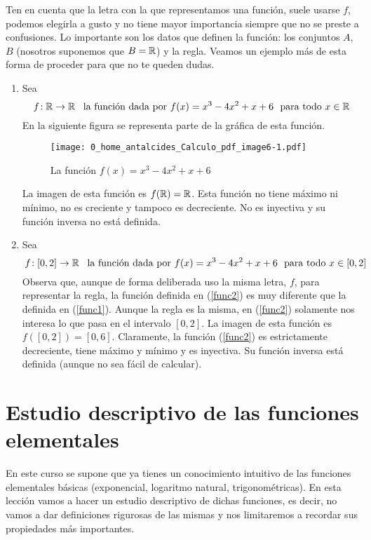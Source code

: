 \documentclass[oneside,spanish,2m,twoside,svgnames,x11names,HTML,12pt]{libro-matua}\usepackage[]{graphicx}\usepackage[]{color}
\begin{document}
Ten en cuenta que la letra con la que representamos una función, suele
usarse $f$, podemos elegirla a gusto y no tiene mayor importancia
siempre que no se preste a confusiones. Lo importante son los datos
que definen la función: los conjuntos $A$, $B$ (nosotros suponemos
que $B=\mathbb R$) y la regla. Veamos un ejemplo más de esta forma de proceder
para que no te queden dudas. 
\begin{enumerate}
\item Sea 
\begin{equation}
\funcreal{f}{\R}\ \textrm{\ la función dada por\ }f(x)=x^{3}-4x^{2}+x+6\ \textrm{\ para todo\ }x\in\R\label{func1}
\end{equation}
En la siguiente figura se representa parte de la gráfica de esta función.

\begin{figure}[ht]
\centering \texttt{[image: 0\_home\_antalcides\_Calculo\_pdf\_image6-1.pdf]}\caption{La función $f(x)=x^{3}-4x^{2}+x+6$}
\end{figure}

La imagen de esta función es $f(\mathbb R)=\mathbb R$. Esta función no tiene máximo
ni mínimo, no es creciente y tampoco es decreciente. No es inyectiva
y su función inversa no está definida.
\item Sea 
\begin{equation}
\funcreal{f}{[0,2]}\ \textrm{\ la función dada por\ }f(x)=x^{3}-4x^{2}+x+6\ \textrm{\ para todo\ }x\in[0,2]\label{func2}
\end{equation}
Observa que, aunque de forma deliberada uso la misma letra, $f$,
para representar la regla, la función definida en (\ref{func2}) es
muy diferente que la definida en (\ref{func1}). Aunque la regla es
la misma, en (\ref{func2}) solamente nos interesa lo que pasa en
el intervalo $[0,2]$. La imagen de esta función es $f([0,2])=[0,6]$.
Claramente, la función (\ref{func2}) es estrictamente decreciente,
tiene máximo y mínimo y es inyectiva. Su función inversa está definida
(aunque no sea fácil de calcular). 
\end{enumerate}

\section[Estudio descriptivo de las funciones elementales]{{Estudio descriptivo de las funciones elementales}}

En este curso se supone que ya tienes un conocimiento intuitivo de
las funciones elementales básicas (exponencial, logaritmo natural,
trigonométricas). En esta lección vamos a hacer un estudio descriptivo
de dichas funciones, es decir, no vamos a dar definiciones rigurosas
de las mismas y nos limitaremos a recordar sus propiedades más importantes.
\end{document}

